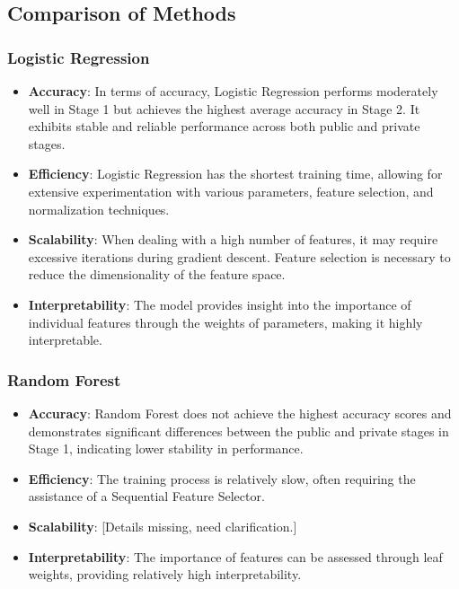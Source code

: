 \documentclass[12pt,a4paper]{article}
\begin{document}

\subsection*{Comparison of Methods}

\subsubsection*{Logistic Regression}
\begin{itemize}
    \item \textbf{Accuracy}: In terms of accuracy, Logistic Regression performs moderately well in Stage 1 but achieves the highest average accuracy in Stage 2. It exhibits stable and reliable performance across both public and private stages.
    \item \textbf{Efficiency}: Logistic Regression has the shortest training time, allowing for extensive experimentation with various parameters, feature selection, and normalization techniques.
    \item \textbf{Scalability}: When dealing with a high number of features, it may require excessive iterations during gradient descent. Feature selection is necessary to reduce the dimensionality of the feature space.
    \item \textbf{Interpretability}: The model provides insight into the importance of individual features through the weights of parameters, making it highly interpretable.
\end{itemize}

\subsubsection*{Random Forest}
\begin{itemize}
    \item \textbf{Accuracy}: Random Forest does not achieve the highest accuracy scores and demonstrates significant differences between the public and private stages in Stage 1, indicating lower stability in performance.
    \item \textbf{Efficiency}: The training process is relatively slow, often requiring the assistance of a Sequential Feature Selector.
    \item \textbf{Scalability}: [Details missing, need clarification.]
    \item \textbf{Interpretability}: The importance of features can be assessed through leaf weights, providing relatively high interpretability.
\end{itemize}
\end{document}
